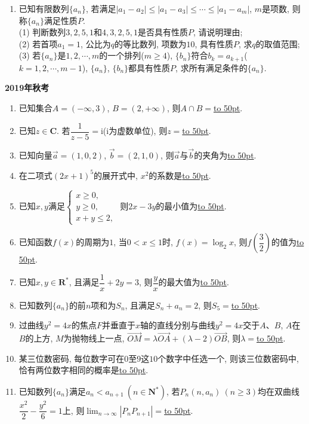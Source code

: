\documentclass[10pt,a4paper]{article}
\newcommand{\blank}[1]{\underline{\hbox to #1pt{}}}
\begin{document}
\begin{enumerate}[1.]
\item 已知有限数列$\{a_n\}$, 若满足$|a_1-a_2|\le |a_1-a_3|\le \cdots \le |a_1-a_m|$, $m$是项数, 则称$\{a_n\}$满足性质$P$.\\
(1) 判断数列$3,2,5,1$和$4,3,2,5,1$是否具有性质$P$, 请说明理由;\\
(2) 若首项$a_1=1$, 公比为$q$的等比数列, 项数为$10$, 具有性质$P$, 求$q$的取值范围;\\
(3) 若$\{a_n\}$是$1,2,\cdots,m$的一个排列($m\ge 4$), $\{b_n\}$符合$b_k=a_{k+1}$($k=1,2,\cdots,m-1$), $\{a_n\}$, $\{b_n\}$都具有性质$P$, 求所有满足条件的$\{a_n\}$.
\end{enumerate}

\newpage




{\bf 2019年秋考}

\begin{enumerate}[1.]
\item 已知集合$A=(-\infty,3)$, $B=(2,+\infty)$, 则$A\cap B=$\blank{50}.
\item 已知$z\in \mathbf{C}$. 若$\dfrac{1}{z-5}=\mathrm{i}$($\mathrm{i}$为虚数单位), 则$z=$\blank{50}.
\item 已知向量$\overrightarrow{a}=(1,0,2)$, $\overrightarrow{b}=(2,1,0)$, 则$\overrightarrow{a}$与$\overrightarrow{b}$的夹角为\blank{50}.
\item 在二项式$(2x+1)^5$的展开式中, $x^2$的系数是\blank{50}.
\item 已知$x,y$满足$\begin{cases} x\ge 0, \\ y \ge 0, \\ x+y \le 2,\end{cases}$ 则$2x-3y$的最小值为\blank{50}.
\item  已知函数$f(x)$的周期为$1$, 当$0<x\le 1$时, $f(x)=\log_2 x$, 则$f\left(\dfrac{3}{2}\right)$的值为\blank{50}.
\item 已知$x,y\in \mathbf{R}^*$, 且满足$\dfrac{1}{x}+2y=3$, 则$\dfrac{y}{x}$的最大值为\blank{50}.
\item 已知数列$\{a_n\}$的前$n$项和为$S_n$, 且满足$S_n+a_n=2$, 则$S_5=$\blank{50}.
\item 过曲线$y^2=4x$的焦点$F$并垂直于$x$轴的直线分别与曲线$y^2=4x$交于$A$、$B$, $A$在$B$的上方, $M$为抛物线上一点, $\overrightarrow{OM}=\lambda \overrightarrow{OA}+(\lambda-2) \overrightarrow{OB}$, 则$\lambda=$\blank{50}.
\item 某三位数密码, 每位数字可在$0$至$9$这$10$个数字中任选一个, 则该三位数密码中, 恰有两位数字相同的概率是\blank{50}.
\item 已知数列$\{a_n\}$满足$a_n<a_{n+1} \ (n\in \mathbf{N}^*)$, 若$P_n(n,a_n) \ (n\ge 3)$均在双曲线$\dfrac{x^2}{2}-\dfrac{y^2}{6}=1$上, 则$\displaystyle\lim_{n\to \infty}|P_nP_{n+1}|=$\blank{50}.

\end{enumerate}
\end{document}
